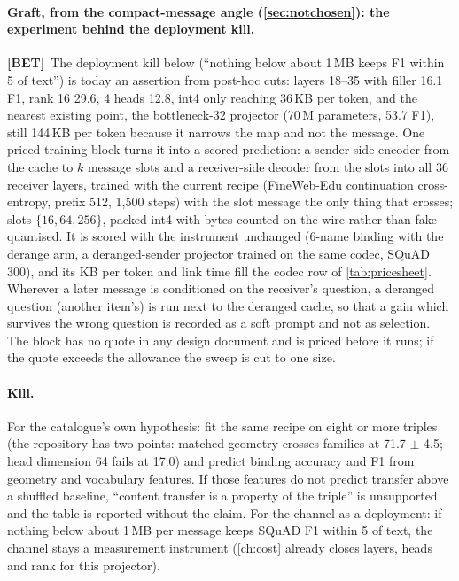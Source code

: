 \documentclass[11pt,a4paper]{report}
\newcommand{\BET}{\textcolor{betc}{\textbf{\scriptsize[BET]}}}
\begin{document}
\paragraph{Graft, from the compact-message angle (\cref{sec:notchosen}): the experiment behind the deployment kill.} \BET\ The deployment kill below (``nothing below about 1\,MB keeps F1 within 5 of text'') is today an assertion from post-hoc cuts: layers 18--35 with filler 16.1 F1, rank 16 29.6, 4 heads 12.8, int4 only reaching 36\,KB per token, and the nearest existing point, the bottleneck-32 projector (70\,M parameters, 53.7 F1), still 144\,KB per token because it narrows the map and not the message. One priced training block turns it into a scored prediction: a sender-side encoder from the cache to $k$ message slots and a receiver-side decoder from the slots into all 36 receiver layers, trained with the current recipe (FineWeb-Edu continuation cross-entropy, prefix 512, 1,500 steps) with the slot message the only thing that crosses; slots $\{16, 64, 256\}$, packed int4 with bytes counted on the wire rather than fake-quantised. It is scored with the instrument unchanged (6-name binding with the derange arm, a deranged-sender projector trained on the same codec, SQuAD 300), and its KB per token and link time fill the codec row of \cref{tab:pricesheet}. Wherever a later message is conditioned on the receiver's question, a deranged question (another item's) is run next to the deranged cache, so that a gain which survives the wrong question is recorded as a soft prompt and not as selection. The block has no quote in any design document and is priced before it runs; if the quote exceeds the allowance the sweep is cut to one size.

\paragraph{Kill.} For the catalogue's own hypothesis: fit the same recipe on eight or more triples (the repository has two points: matched geometry crosses families at 71.7 $\pm$ 4.5; head dimension 64 fails at 17.0) and predict binding accuracy and F1 from geometry and vocabulary features. If those features do not predict transfer above a shuffled baseline, ``content transfer is a property of the triple'' is unsupported and the table is reported without the claim. For the channel as a deployment: if nothing below about 1\,MB per message keeps SQuAD F1 within 5 of text, the channel stays a measurement instrument (\cref{ch:cost} already closes layers, heads and rank for this projector).
\end{document}
